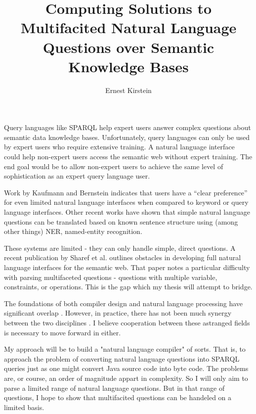\documentclass[11pt]{article}
\begin{document}
\title{Computing Solutions to Multifacited Natural Language Questions over Semantic Knowledge Bases}
\author{Ernest Kirstein}
\maketitle

Query languages like SPARQL help expert users answer complex
questions about semantic data knowledge bases. Unfortunately, query languages
can only be used by expert users who require extensive training. 
A natural language interface could help non-expert users access the 
semantic web without expert training. The end goal would be to allow
non-expert users to achieve the same level of sophistication 
as an expert query language user. 

Work by Kaufmann and Bernstein \cite{usability} indicates 
that users have a “clear preference” for even limited natural language interfaces 
when compared to keyword or query language interfaces. 
Other recent works \cite{mapping, freya, galitsky}
have shown that simple natural language questions can be translated based 
on known sentence structure using (among other things) NER, named-entity recognition.

These systems are limited - they can only handle simple, direct questions. 
A recent publication by Sharef et al. \cite{issues} outlines obstacles in developing full 
natural language interfaces for the semantic web. That paper notes a particular 
difficulty with parsing multifaceted questions - questions with multiple 
variable, constraints, or operations. This is the gap which my thesis will 
attempt to bridge.

The foundations of both compiler design and natural language processing
have significant overlap \cite{chomsky, reghizzi}. 
However, in practice, there has not been
much synergy between the two disciplines \cite{aho, anatomy, reghizzi}.
I believe cooperation between these astranged fields is necessary to move forward
in either.

My approach will be to build a "natural language compiler" of sorts.
That is, to approach the problem of converting natural language questions into
SPARQL queries just as one might convert Java source code into byte code.
The problems are, or course, an order of magnitude appart in complexity.
So I will only aim to parse a limited range of natural language questions.
But in that range of questions, I hope to show that multifacited questions
can be handeled on a limited basis.

{}

\end{document}
